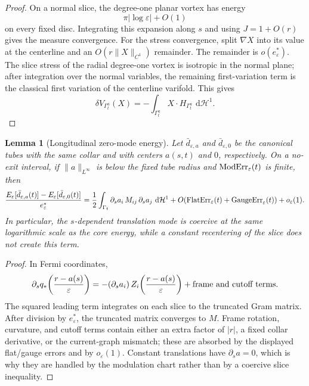\documentclass[11pt]{article}
\newtheorem{lemma}[theorem]{Lemma}
\theoremstyle{definition}
\newcommand{\dd}{\,\mathrm d}
\newcommand{\eps}{\varepsilon}
\newcommand{\estar}{e_\varepsilon^\ast}
\newcommand{\Hh}{\mathcal H}
\begin{document}
\begin{proof}
On a normal slice, the degree-one planar vortex has energy
\[
        \pi|\log\eps|+O(1)
\]
on every fixed disc.  Integrating this expansion along \(s\) and using
\(J=1+O(r)\) gives the measure convergence.  For the stress convergence, split
\(\nabla X\) into its value at the centerline and an \(O(r\|X\|_{C^1})\)
remainder.  The remainder is \(o(\estar)\).  The slice stress of the radial
degree-one vortex is isotropic in the normal plane; after integration over the
normal variables, the remaining first-variation term is the classical
first variation of the centerline varifold.  This gives
\[
        \delta V_{\Gamma_t^a}(X)
        =
        -\int_{\Gamma_t^a}X\cdot H_{\Gamma_t^a}\,\dd\Hh^1 .
\]
\end{proof}

\begin{lemma}[Longitudinal zero-mode energy]
\label{lem:app-longitudinal-zero-mode}
Let \(\bar d_{\eps,a}\) and \(\bar d_{\eps,0}\) be the canonical tubes with the
same collar and with centers \(a(s,t)\) and \(0\), respectively.  On a no-exit
interval, if \(\|a\|_{L^\infty}\) is below the fixed tube radius and
\({\rm ModErr}_\eps(t)\) is finite, then
\[
        \frac{E_\eps[\bar d_{\eps,a}(t)]
        -E_\eps[\bar d_{\eps,0}(t)]}{\estar}
        =
        \frac12
        \int_{\Gamma_t}
        \partial_s a_i\,M_{ij}\,\partial_s a_j\,\dd\Hh^1
        +
        O({\rm FlatErr}_\eps(t)+{\rm GaugeErr}_\eps(t))
        +
        o_\eps(1).
\]
In particular, the \(s\)-dependent translation mode is coercive at the same
logarithmic scale as the core energy, while a constant recentering of the slice
does not create this term.
\end{lemma}

\begin{proof}
In Fermi coordinates,
\[
        \partial_s q_\ast\!\left(\frac{r-a(s)}{\eps}\right)
        =
        -(\partial_s a_i)\,Z_i\!\left(\frac{r-a(s)}{\eps}\right)
        +
        \hbox{frame and cutoff terms}.
\]
The squared leading term integrates on each slice to the truncated Gram matrix.
After division by \(\estar\), the truncated matrix converges to \(M\).  Frame
rotation, curvature, and cutoff terms contain either an extra factor of
\(|r|\), a fixed collar derivative, or the current-graph mismatch; these are
absorbed by the displayed flat/gauge errors and by \(o_\eps(1)\).  Constant
translations have \(\partial_s a=0\), which is why they are handled by the
modulation chart rather than by a coercive slice inequality.
\end{proof}
\end{document}
